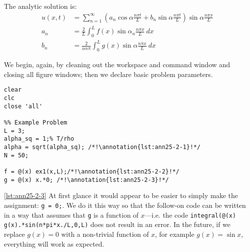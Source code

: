 \vspace{0.25cm}
\noindent The analytic solution is:
\begin{align*}
u(x,t) &= \sum\limits_{n=1}^{\infty} \left(a_n \cos{\alpha \frac{n \pi t}{L}} + b_n \sin{\alpha \frac{n \pi t}{L}} \right) \sin{\alpha \frac{n \pi x}{L}} \\
a_n &= \frac{2}{L} \int_{0}^{L} f(x) \sin{\alpha_n \frac{n \pi x}{L}} \ dx \\
b_n &= \frac{2}{\alpha n \pi} \int_{0}^{L} g(x) \sin{\alpha \frac{n \pi x}{L}} \ dx
\end{align*}

\setcounter{lstannotation}{0} %

\vspace{0.2cm}

\noindent We begin, again, by cleaning out the workspace and command window and closing all figure windows; then we declare basic problem parameters.
\begin{lstlisting}[name=lec25-ex2, style=myMatlab]
clear
clc
close 'all'

%% Example Problem
L = 3;
alpha_sq = 1;% T/rho
alpha = sqrt(alpha_sq); /*!\annotation{lst:ann25-2-1}!*/
N = 50;

f = @(x) ex1(x,L);/*!\annotation{lst:ann25-2-2}!*/
g = @(x) x.*0; /*!\annotation{lst:ann25-2-3}!*/
\end{lstlisting}
\vspace{0.2cm}

\ref{lst:ann25-2-3} At first glance it would appear to be easier to simply make the assignment: \lstinline[style=myMatlab]{g = 0;}.  We do it this way so that the follow-on code can be written in a way that assumes that \lstinline{g} is a function of $x$---i.e. the code \lstinline[style=myMatlab]{integral(@(x) g(x).*sin(n*pi*x./L,0,L)} does not result in an error. In the future, if we replace $g(x)=0$ with a  non-trivial function of $x$, for example $g(x)=\sin{x}$, everything will work as expected.


